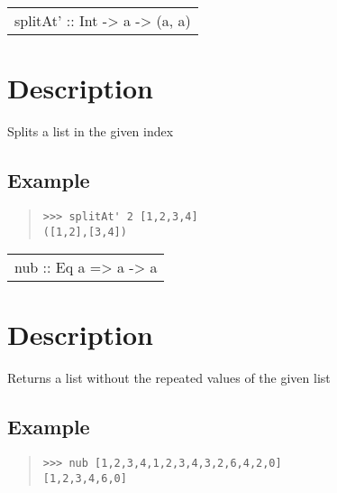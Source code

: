 \begin{haddockdesc}
\item[\begin{tabular}{@{}l}
splitAt' :: Int -> {\char 91}a{\char 93} -> ({\char 91}a{\char 93}, {\char 91}a{\char 93})
\end{tabular}]
{\haddockbegindoc
\section*{Description}
Splits a list in the given index\par
\subsection*{Example}
\begin{quote}
{\haddockverb\begin{verbatim}
>>> splitAt' 2 [1,2,3,4]
([1,2],[3,4])

\end{verbatim}}
\end{quote}}
\end{haddockdesc}
\begin{haddockdesc}
\item[\begin{tabular}{@{}l}
nub :: Eq a => {\char 91}a{\char 93} -> {\char 91}a{\char 93}
\end{tabular}]
{\haddockbegindoc
\section*{Description}
Returns a list without the repeated values of the given list\par
\subsection*{Example}
\begin{quote}
{\haddockverb\begin{verbatim}
>>> nub [1,2,3,4,1,2,3,4,3,2,6,4,2,0]
[1,2,3,4,6,0]

\end{verbatim}}
\end{quote}}
\end{haddockdesc}
